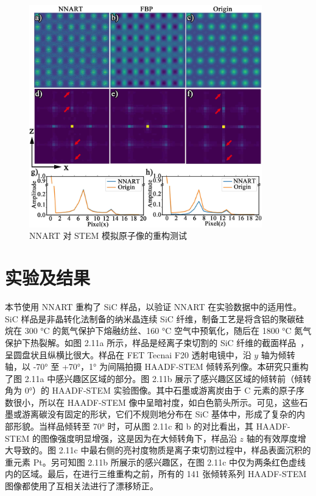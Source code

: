 \begin{figure}[H]
	\vspace{\baselineskip}
	\centering
	\includegraphics[width=0.9\textwidth]{../3.7/37}
	\caption{NNART 对 STEM 模拟原子像的重构测试}\label{fig:37}
	\song{}
\end{figure}

\section{实验及结果}
本节使用 NNART 重构了 SiC 样品，以验证 NNART 在实验数据中的适用性。SiC 样品是非晶转化法制备的纳米晶连续 SiC 纤维，制备工艺是将含铝的聚碳硅烷在 300 °C 的氮气保护下熔融纺丝、160  °C 空气中预氧化，随后在 1800 °C 氮气保护下热裂解。如图 2.11a 所示，样品是经离子束切割的 SiC 纤维的截面样品~\cite{Zhang2018}，呈圆盘状且纵横比很大。样品在 FET Tecnai F20 透射电镜中，沿 $y$ 轴为倾转轴，以 -70° 至 +70°，1° 为间隔拍摄 HAADF-STEM 倾转系列像。本研究只重构了图 2.11a 中感兴趣区区域的部分。图 2.11b 展示了感兴趣区区域的倾转前（倾转角为 0°）的 HAADF-STEM 实验图像。其中石墨或游离炭由于 C 元素的原子序数很小，所以在 HAADF-STEM 像中呈暗衬度，如白色箭头所示。可见，这些石墨或游离碳没有固定的形状，它们不规则地分布在 SiC 基体中，形成了复杂的内部形貌。当样品倾转至 70° 时，可从图 2.11c 和 b 的对比看出，其 HAADF-STEM 的图像强度明显增强，这是因为在大倾转角下，样品沿 $z$ 轴的有效厚度增大导致的。图 2.11c 中最右侧的亮衬度物质是离子束切割过程中，样品表面沉积的重元素 Pt。另可知图 2.11b 所展示的感兴趣区，在图 2.11c 中仅为两条红色虚线内的区域。最后，在进行三维重构之前，所有的 141 张倾转系列 HAADF-STEM 图像都使用了互相关法进行了漂移矫正。

